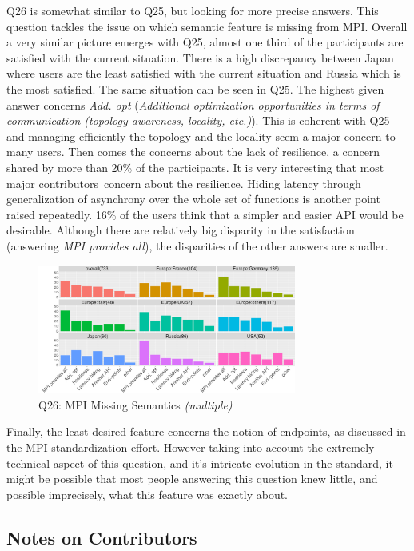 \documentclass[preprint,5p,times]{elsarticle}
\def\myquote#1{{\it #1}}
\def\Countries{Contributors}%
\def\mcountries{major contributors}%
\begin{document}
Q26 is somewhat similar to Q25, but looking for more precise answers.
This question tackles the issue on which semantic feature is missing
from MPI. Overall a very similar picture emerges with Q25, almost one
third of the participants are satisfied with the current
situation. There is a high discrepancy between Japan where users are
the least satisfied with the current situation and Russia which is
the most satisfied. The same situation can be seen in Q25. The highest
given answer concerns \myquote{Add. opt} (\myquote{Additional
  optimization opportunities in terms of communication (topology
  awareness, locality, etc.)}). This is coherent with Q25 and managing
efficiently the topology and the locality seem a major concern to many
users. Then
comes the concerns about the lack of resilience, a concern shared by
more than 20\% of the participants. It is very interesting that most
\mcountries\  concern about the resilience. Hiding latency through
generalization of asynchrony over the whole set of functions is
another point raised repeatedly. 16\% of the users think that a
simpler and easier API would be desirable.
Although there are relatively big disparity in the satisfaction
(answering \myquote{MPI provides all}), the disparities of the other
answers are smaller.

\begin{figure}[htb]
\begin{center}
\includegraphics[width=8.5cm]{R-scripts/Q26.pdf}
\caption{Q26: MPI Missing Semantics {\it(multiple)}}
\label{fig:missing-semantics}
\end{center}
\end{figure}

Finally, the least desired feature concerns the notion of endpoints,
as discussed in the MPI standardization effort. However taking into
account the extremely
technical aspect of this question, and it's intricate evolution in the
standard, it might be possible that most people answering this
question knew little, and possible imprecisely, what this feature was
exactly about.

\subsection{Notes on \Countries}
\end{document}
